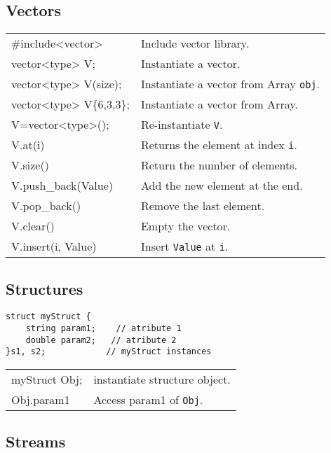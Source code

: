 \documentclass[5pt]{article}
\begin{document}
\begin{multicols}{2}
\subsection{Vectors}
\begin{tabular}{>{\ttfamily}l l}
\#include<vector>           & Include vector library.\\
vector<type> V;             & Instantiate a vector.\\
vector<type> V(size);       & Instantiate a vector from Array \texttt{obj}.\\
vector<type> V\{6,3,3\};    & Instantiate a vector from Array.\\
V=vector<type>();           & Re-instantiate \texttt{V}.\\
V.at(i)                     & Returns the element at index \texttt{i}.\\
V.size()                    & Return the number of elements.\\
V.push\_back(Value)         & Add the new element at the end.\\
V.pop\_back()               & Remove the last element.\\
V.clear()                   & Empty the vector.\\
V.insert(i, Value)          & Insert \texttt{Value} at \texttt{i}.
\end{tabular}


\subsection{Structures}
\begin{verbatim}
struct myStruct {
    string param1;    // atribute 1
    double param2;   // atribute 2
}s1, s2;            // myStruct instances
\end{verbatim}
\begin{tabular}{>{\ttfamily}l l}
myStruct Obj;   & instantiate structure object.\\
Obj.param1      & Access param1 of \texttt{Obj}.\\
\end{tabular}


\subsection{Streams}
\begin{tabular}{>{\ttfamily}l l}


\end{tabular}
\end{multicols}
\end{document}
